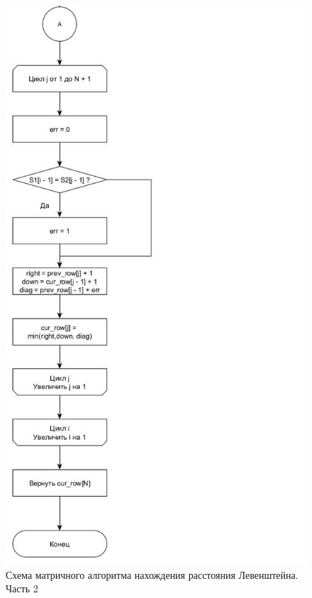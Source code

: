 \documentclass[14pt,russian]{scrartcl}
\begin{document}
\begin{figure}[h]
	\centering
	\includegraphics[scale=0.9]{matr_lev12.jpg}
	\caption{Схема матричного алгоритма нахождения расстояния Левенштейна. Часть 2}
	\label{fig:iter_lev2}
\end{figure}
\end{document}
